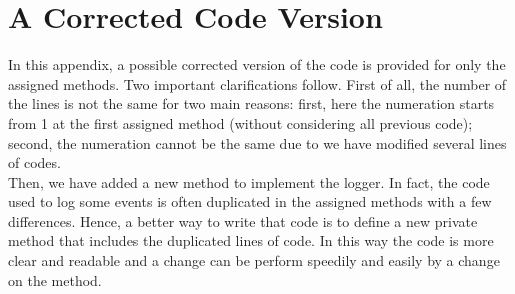 \documentclass[\mainpath/main]{subfiles}
\begin{document}
\chapter{A Corrected Code Version} %
\label{AppendixB:Correction}

\setmyfancystyle

In this appendix, a possible corrected version of the code is provided for only the assigned methods. Two important clarifications follow. First of all, the number of the lines is not the same for two main reasons: first, here the numeration starts from 1 at the first assigned method (without considering all previous code); second, the numeration cannot be the same due to we have modified several lines of codes.\\
Then, we have added a new method to implement the logger. In fact, the code used to log some events is often duplicated in the assigned methods with a few differences. Hence, a better way to write that code is to define a new private method that includes the duplicated lines of code. In this way the code is more clear and readable and a change can be perform speedily and easily by a change on the method.


\end{document}

